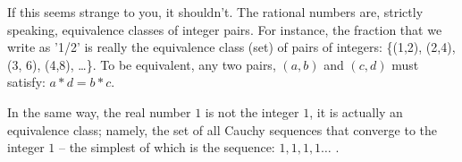 \documentclass{article}
\begin{document}
If this seems strange to you, it shouldn't. The rational numbers are, strictly 
speaking, equivalence classes of integer pairs.
For instance, the fraction that we write as '1/2' is really the 
equivalence class (set) of pairs of integers: 
\{(1,2), (2,4), (3, 6), (4,8), \ldots \}.
To be equivalent, any two pairs, $(a, b)$ and $(c, d)$ must satisfy: 
$a * d = b * c$.

In the same way, the real number $1$ is not the integer $1$, it is actually an equivalence 
class; namely, the set of all Cauchy sequences that converge to the integer 
$1$ -- the simplest of which is the sequence: $1, 1, 1, 1\ldots$ .
\end{document}
